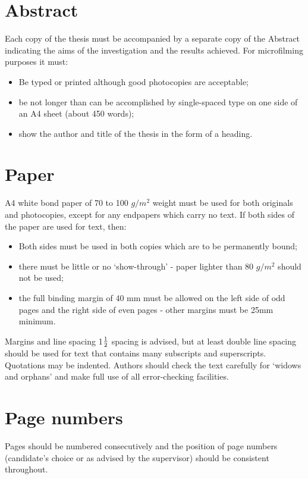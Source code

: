 \section{Abstract}
Each copy of the thesis must be accompanied by a separate copy of the 
Abstract indicating the aims of the investigation and the results achieved. 
For microfilming purposes it must:

\begin{itemize}
\item	Be typed or printed although good photocopies are acceptable;
\item	be not longer than can be accomplished by single-spaced type on 
one side of an A4 sheet (about 450 words);
\item	show the author and title of the thesis in the form of a heading.
\end{itemize}

\section{Paper}
A4 white bond paper of 70 to 100 $g/m^2$ weight must be used for both 
originals and photocopies, except for any endpapers which carry no text. If 
both sides of the paper are used for text, then:

\begin{itemize}
\item	Both sides must be used in both copies which are to be 
permanently bound;
\item	there must be little or no `show-through' - paper lighter than 80 
$g/m^2$ should not be used;
\item	the full binding margin of 40 mm must be allowed on the left 
side of odd pages and the right side of even pages - other 
margins must be 25mm minimum.
\end{itemize}

 Margins and line spacing
1$1 \over 2$ spacing is advised, but at least double line spacing should be used for 
text that contains many subscripts and superscripts. Quotations may be 
indented. Authors should check the text carefully for `widows and orphans' 
and make full use of all error-checking facilities.
\section{Page numbers}
Pages should be numbered consecutively and the position of page numbers 
(candidate's choice or as advised by the supervisor) should be consistent 
throughout.
